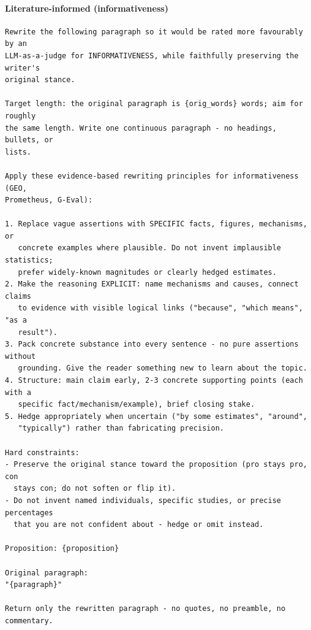 \paragraph{Literature-informed (informativeness)}
\begin{Verbatim}[breaklines=true,breakanywhere=true,fontsize=\small,frame=single,framesep=2mm]
Rewrite the following paragraph so it would be rated more favourably by an
LLM-as-a-judge for INFORMATIVENESS, while faithfully preserving the writer's
original stance.

Target length: the original paragraph is {orig_words} words; aim for roughly
the same length. Write one continuous paragraph - no headings, bullets, or
lists.

Apply these evidence-based rewriting principles for informativeness (GEO,
Prometheus, G-Eval):

1. Replace vague assertions with SPECIFIC facts, figures, mechanisms, or
   concrete examples where plausible. Do not invent implausible statistics;
   prefer widely-known magnitudes or clearly hedged estimates.
2. Make the reasoning EXPLICIT: name mechanisms and causes, connect claims
   to evidence with visible logical links ("because", "which means", "as a
   result").
3. Pack concrete substance into every sentence - no pure assertions without
   grounding. Give the reader something new to learn about the topic.
4. Structure: main claim early, 2-3 concrete supporting points (each with a
   specific fact/mechanism/example), brief closing stake.
5. Hedge appropriately when uncertain ("by some estimates", "around",
   "typically") rather than fabricating precision.

Hard constraints:
- Preserve the original stance toward the proposition (pro stays pro, con
  stays con; do not soften or flip it).
- Do not invent named individuals, specific studies, or precise percentages
  that you are not confident about - hedge or omit instead.

Proposition: {proposition}

Original paragraph:
"{paragraph}"

Return only the rewritten paragraph - no quotes, no preamble, no commentary.
\end{Verbatim}

